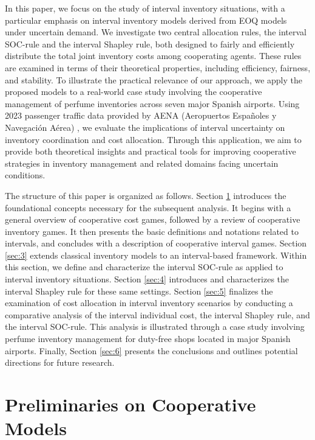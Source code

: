 \documentclass[12pt]{article}
\begin{document}
\noindent In this paper, we focus on the study of interval inventory situations, with a particular emphasis on interval inventory models derived from EOQ models under uncertain demand. We investigate two central allocation rules, the interval SOC-rule and the interval Shapley rule, both designed to fairly and efficiently distribute the total joint inventory costs among cooperating agents. These rules are examined in terms of their theoretical properties, including efficiency, fairness, and stability. To illustrate the practical relevance of our approach, we apply the proposed models to a real-world case study involving the cooperative management of perfume inventories across seven major Spanish airports. Using 2023 passenger traffic data provided by AENA (Aeropuertos Españoles y Navegación Aérea) \cite{aena2023}, we evaluate the implications of interval uncertainty on inventory coordination and cost allocation. Through this application, we aim to provide both theoretical insights and practical tools for improving cooperative strategies in inventory management and related domains facing uncertain conditions.

\noindent The structure of this paper is organized as follows. Section \ref{sec:2} introduces the foundational concepts necessary for the subsequent analysis. It begins with a general overview of cooperative cost games, followed by a review of cooperative inventory games. It then presents the basic definitions and notations related to intervals, and concludes with a description of cooperative interval games. Section \ref{sec:3} extends classical inventory models to an interval-based framework. Within this section, we define and characterize the interval SOC-rule as applied to interval inventory situations. Section \ref{sec:4} introduces and characterizes the interval Shapley rule for these same settings. Section \ref{sec:5} finalizes the examination of cost allocation in interval inventory scenarios by conducting a comparative analysis of the interval individual cost, the interval Shapley rule, and the interval SOC-rule. This analysis is illustrated through a case study involving perfume inventory management for duty-free shops located in major Spanish airports. Finally, Section \ref{sec:6} presents the conclusions and outlines potential directions for future research.


\section{Preliminaries on Cooperative Models}\label{sec:2}  
\end{document}
